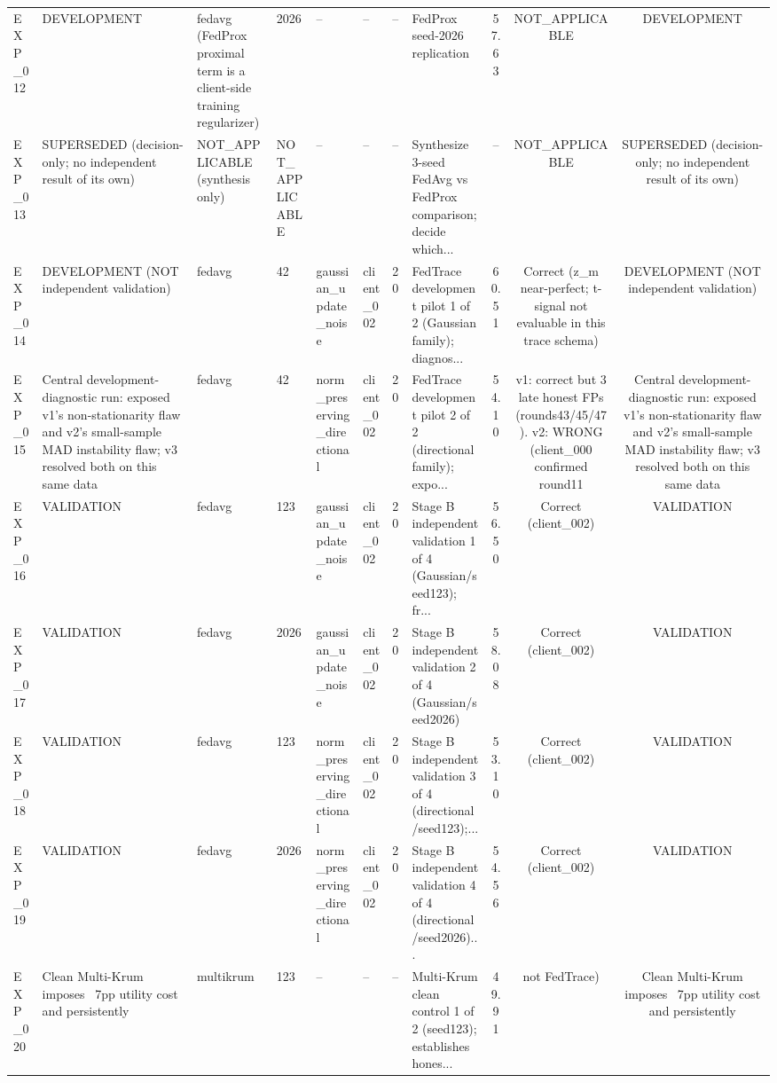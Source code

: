 \begin{table}[t]
\begin{tabular}{llllllllccc}
EXP\_012 & DEVELOPMENT & fedavg (FedProx proximal term is a client-side training regularizer) & 2026 & -- & -- & -- & FedProx seed-2026 replication & 57.63 & NOT\_APPLICABLE & DEVELOPMENT \\
EXP\_013 & SUPERSEDED (decision-only; no independent result of its own) & NOT\_APPLICABLE (synthesis only) & NOT\_APPLICABLE & -- & -- & -- & Synthesize 3-seed FedAvg vs FedProx comparison; decide which... & -- & NOT\_APPLICABLE & SUPERSEDED (decision-only; no independent result of its own) \\
EXP\_014 & DEVELOPMENT (NOT independent validation) & fedavg & 42 & gaussian\_update\_noise & client\_002 & 20 & FedTrace development pilot 1 of 2 (Gaussian family); diagnos... & 60.51 & Correct (z\_m near-perfect; t-signal not evaluable in this trace schema) & DEVELOPMENT (NOT independent validation) \\
EXP\_015 & Central development-diagnostic run: exposed v1's non-stationarity flaw and v2's small-sample MAD instability flaw; v3 resolved both on this same data & fedavg & 42 & norm\_preserving\_directional & client\_002 & 20 & FedTrace development pilot 2 of 2 (directional family); expo... & 54.10 & v1: correct but 3 late honest FPs (rounds43/45/47). v2: WRONG (client\_000 confirmed round11 & Central development-diagnostic run: exposed v1's non-stationarity flaw and v2's small-sample MAD instability flaw; v3 resolved both on this same data \\
EXP\_016 & VALIDATION & fedavg & 123 & gaussian\_update\_noise & client\_002 & 20 & Stage B independent validation 1 of 4 (Gaussian/seed123); fr... & 56.50 & Correct (client\_002) & VALIDATION \\
EXP\_017 & VALIDATION & fedavg & 2026 & gaussian\_update\_noise & client\_002 & 20 & Stage B independent validation 2 of 4 (Gaussian/seed2026) & 58.08 & Correct (client\_002) & VALIDATION \\
EXP\_018 & VALIDATION & fedavg & 123 & norm\_preserving\_directional & client\_002 & 20 & Stage B independent validation 3 of 4 (directional/seed123);... & 53.10 & Correct (client\_002) & VALIDATION \\
EXP\_019 & VALIDATION & fedavg & 2026 & norm\_preserving\_directional & client\_002 & 20 & Stage B independent validation 4 of 4 (directional/seed2026)... & 54.56 & Correct (client\_002) & VALIDATION \\
EXP\_020 & Clean Multi-Krum imposes ~7pp utility cost and persistently & multikrum & 123 & -- & -- & -- & Multi-Krum clean control 1 of 2 (seed123); establishes hones... & 49.91 &  not FedTrace) & Clean Multi-Krum imposes ~7pp utility cost and persistently \\

\end{tabular}
\end{table}
